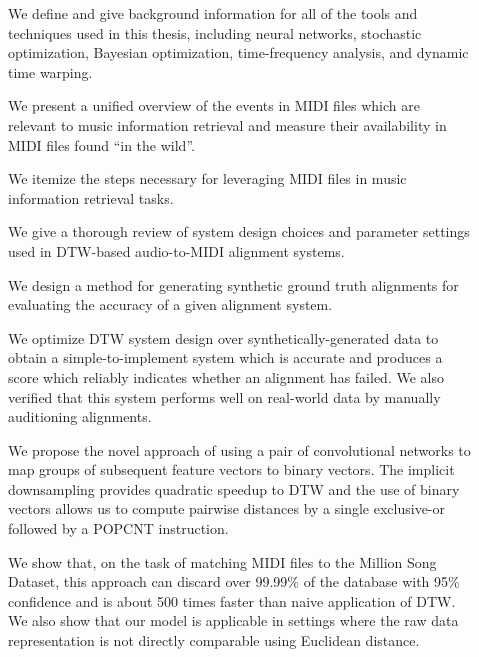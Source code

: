 \begin{description}

\item[] We define and give background information for all of the tools and techniques used in this thesis, including neural networks, stochastic optimization, Bayesian optimization, time-frequency analysis, and dynamic time warping.

\item[] We present a unified overview of the events in MIDI files which are relevant to music information retrieval and measure their availability in MIDI files found ``in the wild''.

\item[] We itemize the steps necessary for leveraging MIDI files in music information retrieval tasks.

\item[] We give a thorough review of system design choices and parameter settings used in DTW-based audio-to-MIDI alignment systems.

\item[] We design a method for generating synthetic ground truth alignments for evaluating the accuracy of a given alignment system.

\item[] We optimize DTW system design over synthetically-generated data to obtain a simple-to-implement system which is accurate and produces a score which reliably indicates whether an alignment has failed.  We also verified that this system performs well on real-world data by manually auditioning alignments.

\item[] We propose the novel approach of using a pair of convolutional networks to map groups of subsequent feature vectors to binary vectors.  The implicit downsampling provides quadratic speedup to DTW and the use of binary vectors allows us to compute pairwise distances by a single exclusive-or followed by a POPCNT instruction.

\item[] We show that, on the task of matching MIDI files to the Million Song Dataset, this approach can discard over 99.99\% of the database with 95\% confidence and is about 500 times faster than naive application of DTW.  We also show that our model is applicable in settings where the raw data representation is not directly comparable using Euclidean distance.


\end{description}

